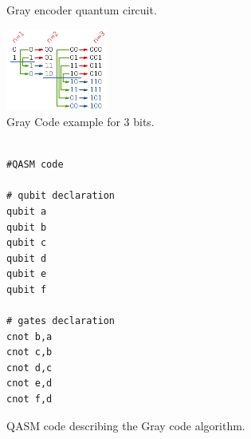 \begin{figure}
    \centering


\label{fig:circuit_example}
\caption{Gray encoder quantum circuit.}
\end{figure}

\begin{figure}[htbp]
\centering
\includegraphics[width=0.3\textwidth]{figures/gray_code.png}
\caption{\label{fig:org2753dff}
Gray Code example for 3 bits.}
\end{figure}

\begin{figure}
\centering
\begin{minipage}{.45\textwidth}

\begin{verbatim}

#QASM code

# qubit declaration
qubit a
qubit b
qubit c
qubit d
qubit e
qubit f

# gates declaration
cnot b,a
cnot c,b
cnot d,c
cnot e,d
cnot f,d

\end{verbatim}

\caption{QASM code describing the Gray code algorithm.}
\label{code:qasm_gray_code}
\end{minipage}
\end{figure}

